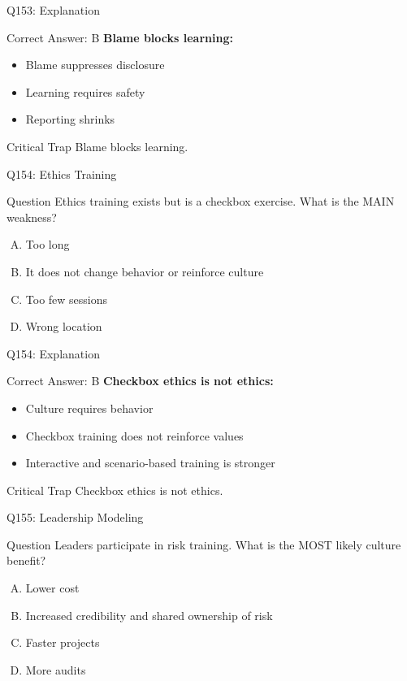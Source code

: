 \documentclass{beamer}
\begin{document}
	\begin{frame}{Q153: Explanation}
		\begin{block}{Correct Answer: B}
			\textbf{Blame blocks learning:}
			\begin{itemize}
				\item Blame suppresses disclosure
				\item Learning requires safety
				\item Reporting shrinks
			\end{itemize}
		\end{block}
		\begin{alertblock}{Critical Trap}
			Blame blocks learning.
		\end{alertblock}
	\end{frame}
	
	\begin{frame}{Q154: Ethics Training}
		\begin{block}{Question}
			Ethics training exists but is a checkbox exercise. What is the MAIN weakness?
		\end{block}
		\begin{enumerate}[(A)]
			\item Too long
			\item It does not change behavior or reinforce culture
			\item Too few sessions
			\item Wrong location
		\end{enumerate}
	\end{frame}
	
	\begin{frame}{Q154: Explanation}
		\begin{block}{Correct Answer: B}
			\textbf{Checkbox ethics is not ethics:}
			\begin{itemize}
				\item Culture requires behavior
				\item Checkbox training does not reinforce values
				\item Interactive and scenario-based training is stronger
			\end{itemize}
		\end{block}
		\begin{alertblock}{Critical Trap}
			Checkbox ethics is not ethics.
		\end{alertblock}
	\end{frame}
	
	\begin{frame}{Q155: Leadership Modeling}
		\begin{block}{Question}
			Leaders participate in risk training. What is the MOST likely culture benefit?
		\end{block}
		\begin{enumerate}[(A)]
			\item Lower cost
			\item Increased credibility and shared ownership of risk
			\item Faster projects
			\item More audits
		\end{enumerate}
	\end{frame}
	
\end{document}
